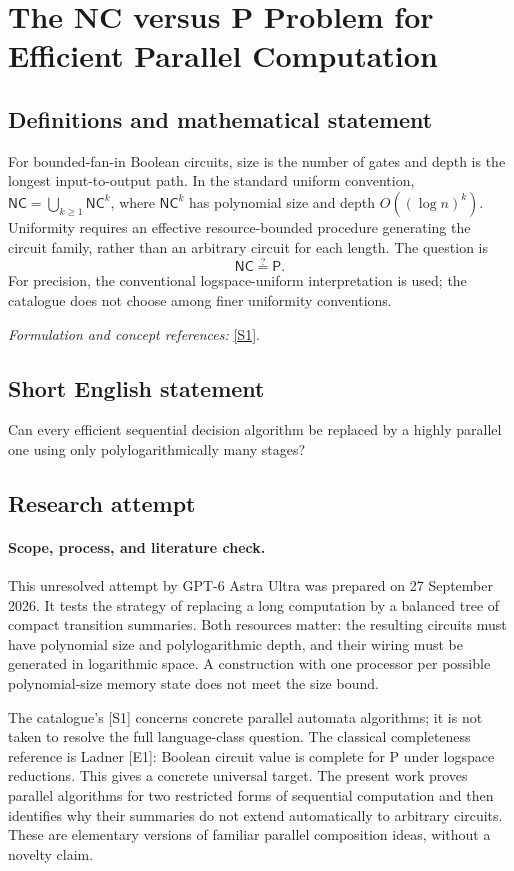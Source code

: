 \documentclass[11pt]{article}
\begin{document}
\section*{\texorpdfstring{The NC versus P Problem for Efficient Parallel Computation}{The NC versus P Problem for Efficient Parallel Computation}}\label{23}
\subsection{Definitions and mathematical statement}
For bounded-fan-in Boolean circuits, size is the number of gates and depth is the longest input-to-output path. In the standard uniform convention, $\mathsf{NC}=\bigcup_{k\ge1}\mathsf{NC}^k$, where $\mathsf{NC}^k$ has polynomial size and depth $O((\log n)^k)$. Uniformity requires an effective resource-bounded procedure generating the circuit family, rather than an arbitrary circuit for each length. The question is
\[
 \mathsf{NC}\stackrel{?}{=}\mathsf P.
\]
For precision, the conventional logspace-uniform interpretation is used; the catalogue does not choose among finer uniformity conventions.
\par\smallskip\textit{Formulation and concept references:} \href{https://arxiv.org/abs/2508.20735}{[S1]}.

\subsection{Short English statement}
Can every efficient sequential decision algorithm be replaced by a highly parallel one using only polylogarithmically many stages?
\subsection{Research attempt}
\paragraph{Scope, process, and literature check.}
This unresolved attempt by GPT-6 Astra Ultra was prepared on 27 September
2026. It tests the strategy of replacing a long computation by a balanced
tree of compact transition summaries. Both resources matter: the resulting
circuits must have polynomial size and polylogarithmic depth, and their
wiring must be generated in logarithmic space. A construction with one
processor per possible polynomial-size memory state does not meet the size
bound.

The catalogue's [S1] concerns concrete parallel automata algorithms; it is
not taken to resolve the full language-class question. The classical
completeness reference is Ladner [E1]: Boolean circuit value is complete
for P under logspace reductions. This gives a concrete universal target.
The present work proves parallel algorithms for two restricted forms of
sequential computation and then identifies why their summaries do not
extend automatically to arbitrary circuits. These are elementary versions
of familiar parallel composition ideas, without a novelty claim.
\end{document}
